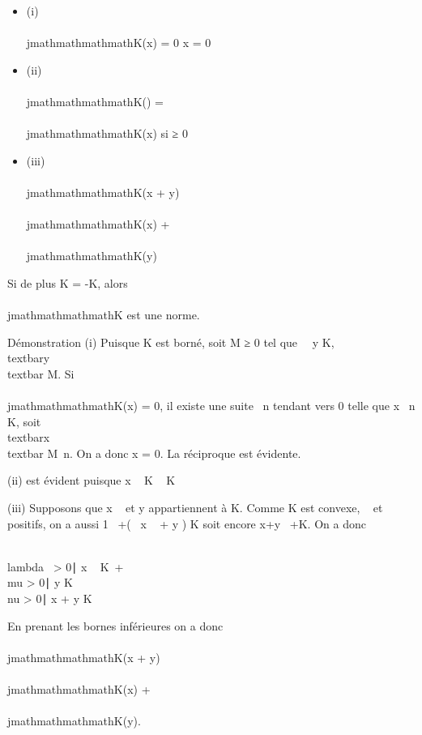 \begin{itemize}
\itemsep1pt\parskip0pt
\item
  (i) \\\\jmathmathmathmathK(x) = 0 \Leftrightarrow x = 0
\item
  (ii) \\\\jmathmathmathmathK(\mux) = \mu\\\\jmathmathmathmathK(x) si \mu ≥ 0
\item
  (iii) \\\\jmathmathmathmathK(x + y) \leq \\\\jmathmathmathmathK(x) + \\\\jmathmathmathmathK(y)
\end{itemize}

Si de plus K = -K, alors \\\\jmathmathmathmathK est une norme.

Démonstration (i) Puisque K est borné, soit M ≥ 0 tel que
\forall~~y \in K,
\\textbar{}y\\textbar{} \leq M. Si
\\\\jmathmathmathmathK(x) = 0, il existe une suite \lambda~n tendant vers 0
telle que  x \over \lambda~n \in K, soit
\\textbar{}x\\textbar{} \leq M\lambda~n.
On a donc x = 0. La réciproque est évidente.

(ii) est évident puisque  x \over \lambda~ \in K
\Leftrightarrow \mux \over \mu\lambda~ \in K

(iii) Supposons que  x \over \lambda~ et  y
\over \mu appartiennent à K. Comme K est convexe, \lambda~ et \mu
positifs, on a aussi  1 \over \lambda~+\mu (\lambda~ x
\over \lambda~ + \mu y \over \mu ) \in K soit
encore  x+y \over \lambda~+\mu \in K. On a donc

\\lambda~ \textgreater{} 0∣ x
\over \lambda~ \in K\ + \\mu
\textgreater{} 0∣ y \over
\mu \in K\ \subset~\\nu \textgreater{}
0∣ x + y \over \nu \in
K\

En prenant les bornes inférieures on a donc \\\\jmathmathmathmathK(x + y) \leq
\\\\jmathmathmathmathK(x) + \\\\jmathmathmathmathK(y).

